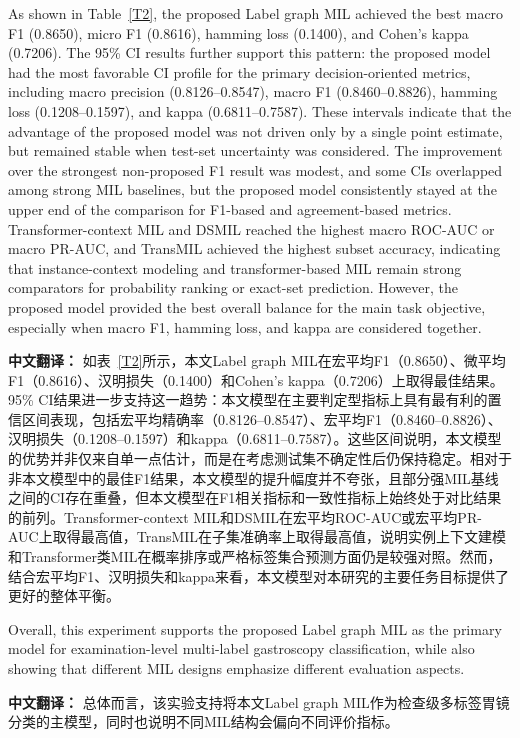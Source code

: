 \documentclass[Afour,sagev,times]{sagej}
\begin{document}
As shown in Table~\ref{T2}, the proposed Label graph MIL achieved the best macro F1 (0.8650), micro F1 (0.8616), hamming loss (0.1400), and Cohen's kappa (0.7206). The 95\% CI results further support this pattern: the proposed model had the most favorable CI profile for the primary decision-oriented metrics, including macro precision (0.8126--0.8547), macro F1 (0.8460--0.8826), hamming loss (0.1208--0.1597), and kappa (0.6811--0.7587). These intervals indicate that the advantage of the proposed model was not driven only by a single point estimate, but remained stable when test-set uncertainty was considered. The improvement over the strongest non-proposed F1 result was modest, and some CIs overlapped among strong MIL baselines, but the proposed model consistently stayed at the upper end of the comparison for F1-based and agreement-based metrics. Transformer-context MIL and DSMIL reached the highest macro ROC-AUC or macro PR-AUC, and TransMIL achieved the highest subset accuracy, indicating that instance-context modeling and transformer-based MIL remain strong comparators for probability ranking or exact-set prediction. However, the proposed model provided the best overall balance for the main task objective, especially when macro F1, hamming loss, and kappa are considered together.

\textbf{中文翻译：} 如表~\ref{T2}所示，本文Label graph MIL在宏平均F1（0.8650）、微平均F1（0.8616）、汉明损失（0.1400）和Cohen's kappa（0.7206）上取得最佳结果。95\% CI结果进一步支持这一趋势：本文模型在主要判定型指标上具有最有利的置信区间表现，包括宏平均精确率（0.8126--0.8547）、宏平均F1（0.8460--0.8826）、汉明损失（0.1208--0.1597）和kappa（0.6811--0.7587）。这些区间说明，本文模型的优势并非仅来自单一点估计，而是在考虑测试集不确定性后仍保持稳定。相对于非本文模型中的最佳F1结果，本文模型的提升幅度并不夸张，且部分强MIL基线之间的CI存在重叠，但本文模型在F1相关指标和一致性指标上始终处于对比结果的前列。Transformer-context MIL和DSMIL在宏平均ROC-AUC或宏平均PR-AUC上取得最高值，TransMIL在子集准确率上取得最高值，说明实例上下文建模和Transformer类MIL在概率排序或严格标签集合预测方面仍是较强对照。然而，结合宏平均F1、汉明损失和kappa来看，本文模型对本研究的主要任务目标提供了更好的整体平衡。

Overall, this experiment supports the proposed Label graph MIL as the primary model for examination-level multi-label gastroscopy classification, while also showing that different MIL designs emphasize different evaluation aspects.

\textbf{中文翻译：} 总体而言，该实验支持将本文Label graph MIL作为检查级多标签胃镜分类的主模型，同时也说明不同MIL结构会偏向不同评价指标。
\end{document}
